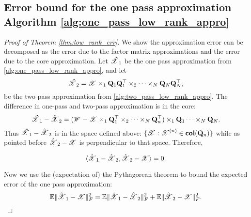 \subsection{Error bound for the one pass approximation Algorithm \ref{alg:one_pass_low_rank_appro}}
\begin{proof}[Proof of Theorem \ref{thm:low_rank_err}]
We show the approximation error can be decomposed as
the error due to the factor matrix approximations
and the error due to the core approximation.
Let $\T{\hat{X}}_1$ be the one pass approximation from \ref{alg:one_pass_low_rank_appro}, and let
\begin{equation}
\T{\hat{X}}_2 = \T{X}\times_1 \mathbf{Q}_1\mathbf{Q}_1^\top \times_2 \cdots \times_N \mathbf{Q}_N\mathbf{Q}_N^\top,
\end{equation}
be the two pass approximation from \ref{alg:two_pass_low_rank_appro}.
The difference in one-pass and two-pass approximation is in the 
core: 
\begin{equation}
\begin{aligned}
\T{\hat{X}}_1-\hat{\T{X}}_2= (\T{W}-\T{X}\times_1 \mathbf{Q}_1^\top \times_2 \cdots \times_N \mathbf{Q}_n^\top)  \times_1 \mathbf{Q}_1 \dots \times_N \mathbf{Q}_N. \nonumber
\end{aligned}
\end{equation}
Thus $\T{\hat{X}}_1-\hat{\T{X}}_2$ is in the space defined above:  $\{ \T{X} : \T{X}^{(n)} 
\in \mathbf{col}(\mathbf{Q}_n) \}$ while as pointed before $\hat{\T{X}}_2 - \T{X}$ is perpendicular  to that space.  Therefore, 

\begin{equation}
\label{eq:inner_zero}
\langle \hat{\T{X}}_1 - \hat{\T{X}}_2, \hat{\T{X}}_2 - \T{X} \rangle = 0.
\end{equation}


Now we use the (expectation of) the Pythagorean theorem 
to bound the expected error of the one pass approximation:
\begin{equation}
\label{eq:error_decom}
 \mathbb{E}\| \hat{\T{X}}_1- \T{X} \|_F^2 = \mathbb{E}\| \hat{\T{X}}_1 - \hat{\T{X}}_2\|_F^2 + \mathbb{E} \|\hat{\T{X}}_2 - \T{X} \|_F^2.
\end{equation}




\end{proof}
